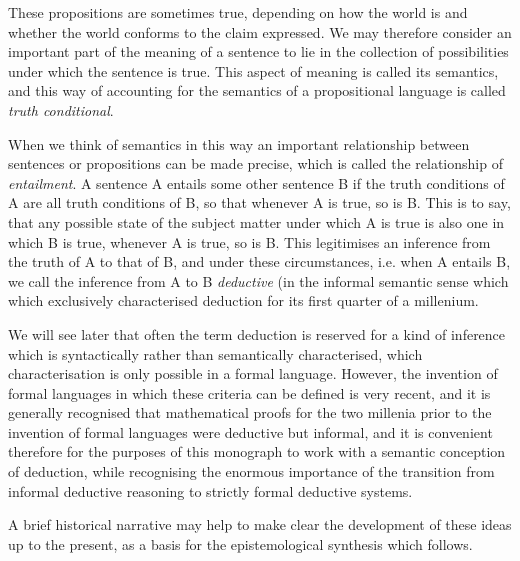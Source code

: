 \documentclass[10pt,titlepage]{book}
\begin{document}
These propositions are sometimes true, depending on how the world is and whether the world conforms to the claim expressed.
We may therefore consider an important part of the meaning of a sentence to lie in the collection of possibilities under which the sentence is true.
This aspect of meaning is called its semantics, and this way of accounting for the semantics of a propositional language is called \emph{truth conditional}.

When we think of semantics in this way an important relationship between sentences or propositions can be made precise, which is called the relationship of \emph{entailment}.
A sentence A entails some other sentence B if the truth conditions of A are all truth conditions of B, so that whenever A is true, so is B.
This is to say, that any possible state of the subject matter under which A is true is also one in which B is true, whenever A is true, so is B.
This legitimises an inference from the truth of A to that of B, and under these circumstances, i.e. when A entails B, we call the inference from A to B \emph{deductive} (in the informal semantic sense which which exclusively characterised deduction for its first quarter of a millenium.

We will see later that often the term deduction is reserved for a kind of inference which is syntactically rather than semantically characterised, which characterisation is only possible in a formal language.
However, the invention of formal languages in which these criteria can be defined is very recent, and it is generally recognised that mathematical proofs for the two millenia prior to the invention of formal languages were deductive but informal, and it is convenient therefore for the purposes of this monograph to work with a semantic conception of deduction, while recognising the enormous importance of the transition from informal deductive reasoning to strictly formal deductive systems.

A brief historical narrative may help to make clear the development of these ideas up to the present, as a basis for the epistemological synthesis which follows.
\end{document}

